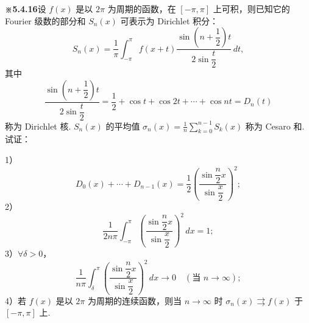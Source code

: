 \documentclass[UTF8, 12pt, fontset=fandol, oneside]{ctexart}
\begin{document}
\noindent\textbf{※5.4.16}\quad 设 $f(x)$ 是以 $2\pi$ 为周期的函数，在 $[-\pi,\pi]$ 上可积，则已知它的 Fourier 级数的部分和
$S_n(x)$ 可表示为 Dirichlet 积分：
\[
  S_n(x)=\frac1\pi\int_{-\pi}^{\pi}f(x+t)
  \frac{\sin\left(n+\dfrac12\right)t}{2\sin\dfrac t2}\,dt,
\]
其中
\[
  \frac{\sin\left(n+\dfrac12\right)t}{2\sin\dfrac t2}
  =\frac12+\cos t+\cos2t+\cdots+\cos nt=D_n(t)
\]
称为 Dirichlet 核. $S_n(x)$ 的平均值
$\displaystyle\sigma_n(x)=\frac1n\sum_{k=0}^{n-1}S_k(x)$ 称为 Cesaro 和. 试证：

1）
\[
  D_0(x)+\cdots+D_{n-1}(x)=\frac12\left(\frac{\sin\dfrac n2x}{\sin\dfrac x2}\right)^2;
\]
2）
\[
  \frac1{2n\pi}\int_{-\pi}^{\pi}
  \left(\frac{\sin\dfrac n2x}{\sin\dfrac x2}\right)^2\,dx=1;
\]
3）$\forall\delta>0$，
\[
  \frac1{n\pi}\int_{\delta}^{\pi}
  \left(\frac{\sin\dfrac n2x}{\sin\dfrac x2}\right)^2\,dx\to0
  \quad(\text{当 }n\to\infty);
\]
4）若 $f(x)$ 是以 $2\pi$ 为周期的连续函数，则当 $n\to\infty$ 时
$\sigma_n(x)\rightrightarrows f(x)$ 于 $[-\pi,\pi]$ 上.
\end{document}
